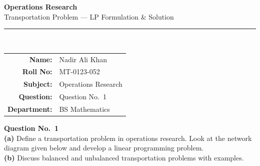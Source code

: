 \documentclass[12pt]{article}
\begin{document}
\thispagestyle{empty}

\begin{tcolorbox}[enhanced, arc=0pt, boxrule=0pt, colback=primary, colframe=primary,
  left=16pt, right=16pt, top=18pt, bottom=14pt, borderline south={4pt}{0pt}{accent}]
  \centering
  {\huge\bfseries\color{white} Operations Research}\\[4pt]
  {\large\color{accent} Transportation Problem --- LP Formulation \& Solution}\\[8pt]
  \color{lightbg}\rule{0.5\textwidth}{0.4pt}\\[8pt]
  \begin{tabular}{rl}
    {\color{lightbg}\textbf{Name:}}       & {\color{white} Nadir Ali Khan} \\[3pt]
    {\color{lightbg}\textbf{Roll No:}}    & {\color{white} MT-0123-052} \\[3pt]
    {\color{lightbg}\textbf{Subject:}}    & {\color{white} Operations Research} \\[3pt]
    {\color{lightbg}\textbf{Question:}}   & {\color{white} Question No.\ 1} \\[3pt]
    {\color{lightbg}\textbf{Department:}} & {\color{white} BS Mathematics} \\
  \end{tabular}
\end{tcolorbox}

\vspace{14pt}

\begin{problembox}
\textbf{Question No.\ 1}\\[6pt]
\textbf{(a)} Define a transportation problem in operations research. Look at the network diagram given below and develop a linear programming problem.\\[6pt]
\textbf{(b)} Discuss balanced and unbalanced transportation problems with examples.
\end{problembox}

\vspace{10pt}
\end{document}
